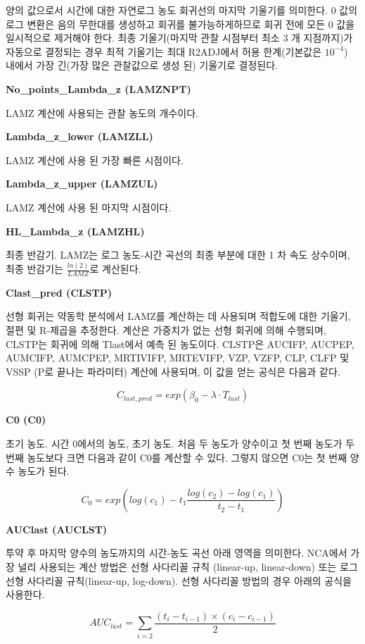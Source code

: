\documentclass[
  11pt,
  krantz2, a4paper, twoside]{krantz}
\theoremstyle{definition}
\theoremstyle{definition}
\theoremstyle{definition}
\theoremstyle{definition}
\theoremstyle{remark}
\begin{document}
양의 값으로서 시간에 대한 자연로그 농도 회귀선의 마지막 기울기를 의미한다. 0 값의 로그 변환은 음의 무한대를 생성하고 회귀를 불가능하게하므로 회귀 전에 모든 0 값을 일시적으로 제거해야 한다. 최종 기울기(마지막 관찰 시점부터 최소 3 개 지점까지)가 자동으로 결정되는 경우 최적 기울기는 최대 R2ADJ에서 허용 한계(기본값은 \(10^{-4}\)) 내에서 가장 긴(가장 많은 관찰값으로 생성 된) 기울기로 결정된다.

\textbf{No\_points\_Lambda\_z (LAMZNPT)}

LAMZ 계산에 사용되는 관찰 농도의 개수이다.

\textbf{Lambda\_z\_lower (LAMZLL)}

LAMZ 계산에 사용 된 가장 빠른 시점이다.

\textbf{Lambda\_z\_upper (LAMZUL)}

LAMZ 계산에 사용 된 마지막 시점이다.

\textbf{HL\_Lambda\_z (LAMZHL)}

최종 반감기. LAMZ는 로그 농도-시간 곡선의 최종 부분에 대한 1 차 속도 상수이며, 최종 반감기는 \(\frac{ln(2)}{LAMZ}\)로 계산된다.

\textbf{Clast\_pred (CLSTP)}

선형 회귀는 약동학 분석에서 LAMZ를 계산하는 데 사용되며 적합도에 대한 기울기, 절편 및 R-제곱을 추정한다. 계산은 가중치가 없는 선형 회귀에 의해 수행되며, CLSTP는 회귀에 의해 Tlast에서 예측 된 농도이다. CLSTP은 AUCIFP, AUCPEP, AUMCIFP, AUMCPEP, MRTIVIFP, MRTEVIFP, VZP, VZFP, CLP, CLFP 및 VSSP (P로 끝나는 파라미터) 계산에 사용되며, 이 값을 얻는 공식은 다음과 같다.

\[ C_ {last, pred} = exp(\beta_{0}-\lambda \cdot T_{last}) \]

\textbf{C0 (C0)}

초기 농도. 시간 0에서의 농도, 초기 농도. 처음 두 농도가 양수이고 첫 번째 농도가 두 번째 농도보다 크면 다음과 같이 C0를 계산할 수 있다. 그렇지 않으면 C0는 첫 번째 양수 농도가 된다.

\[ C_ {0} = exp (log (c_ {1})-t_ {1} \frac {log (c_ {2})-log (c_ {1})} {t_ {2}-t_ {1} }) \]

\textbf{AUClast (AUCLST)}

투약 후 마지막 양수의 농도까지의 시간-농도 곡선 아래 영역을 의미한다. NCA에서 가장 널리 사용되는 계산 방법은 선형 사다리꼴 규칙 (linear-up, linear-down) 또는 로그 선형 사다리꼴 규칙(linear-up, log-down). 선형 사다리꼴 방법의 경우 아래의 공식을 사용한다.

\[AUC_{last} = \sum_{i = 2}^{}\frac{(t_{i} - t_{i - 1}) \times (c_{i} - c_{i - 1})}{2}\]
\end{document}
